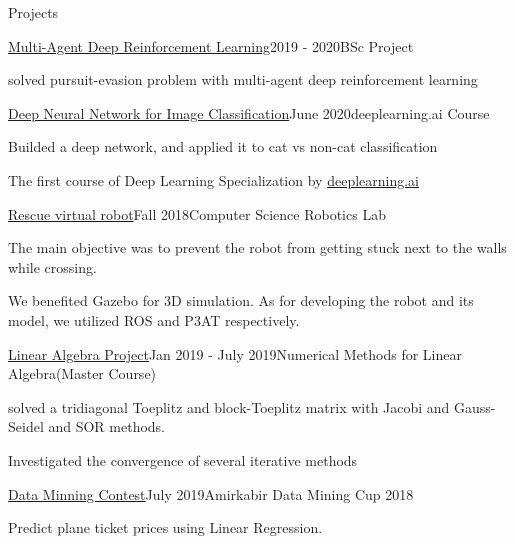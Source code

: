 \documentclass{resume} %
\begin{document}
	
	\begin{rSection}{Projects}

		\begin{rSubsection}{\href{https://github.com/mina-parham/multi-agentDRL}{\textcolor{coolblack}{Multi-Agent Deep Reinforcement Learning}}}{2019 - 2020}{BSc Project}{ }
			\item solved pursuit-evasion problem with multi-agent deep reinforcement learning
			
		\end{rSubsection}
		\begin{rSubsection}{\href{https://github.com/mina-parham/deeplearning-andrewng}{\textcolor{coolblack}{Deep Neural Network for Image Classification}}}{June 2020}{deeplearning.ai Course}{ }
			
			\item Builded a deep network, and applied it to cat vs non-cat classification
			\item  The first course of Deep Learning Specialization by {\href{https://www.deeplearning.ai}{\textcolor{coolblack}{deeplearning.ai}}}
		\end{rSubsection}
			\begin{rSubsection}{\href{https://github.com/mina-parham/Rescue_virtual_robot}{\textcolor{coolblack}{Rescue virtual robot}}}{Fall 2018}{Computer Science Robotics Lab}{ }
			\item The main objective was to prevent the robot from getting stuck next to the walls while crossing. 
			\item  We benefited Gazebo for 3D simulation. As for developing the robot and its model, we utilized ROS and P3AT respectively.
		\end{rSubsection}
        \begin{rSubsection}{\href{https://github.com/mina-parham/linear_algebra}{\textcolor{coolblack}{Linear Algebra Project}}}{Jan 2019 - July 2019}{Numerical Methods for Linear Algebra(Master Course)}{ }
			\item solved a tridiagonal Toeplitz and block-Toeplitz matrix with Jacobi and Gauss-Seidel and SOR methods.
			\item Investigated the convergence of several iterative methods
		\end{rSubsection}
		  \begin{rSubsection}{\href{https://github.com/mina-parham/data_mining_aut}{\textcolor{coolblack}{Data Minning Contest}}}{July 2019}{Amirkabir Data Mining Cup 2018}{ }
			\item Predict plane ticket prices using Linear Regression.
			

\end{rSubsection}
\end{rSection}
\end{document}
